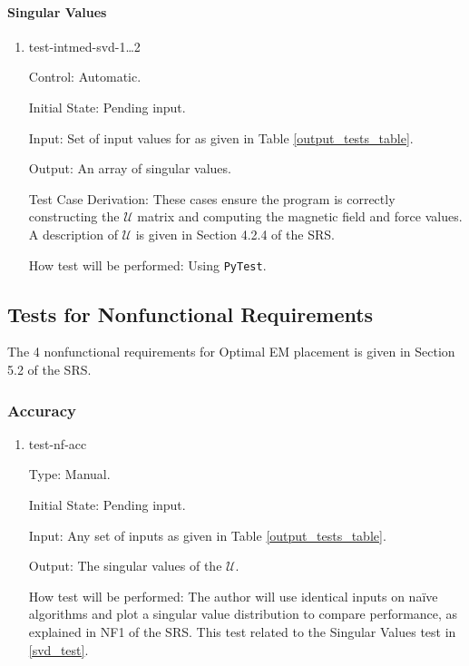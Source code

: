 \documentclass[12pt, titlepage]{article}
\begin{document}
\paragraph{Singular Values}

\begin{enumerate}

  \item{test-intmed-svd-1\dots2\\} 
  
  Control: Automatic.
            
  Initial State: Pending input.
            
  Input: Set of input values for as given in Table \ref{output_tests_table}.
            
  Output: An array of singular values. 
  
  Test Case Derivation: These cases ensure the program is correctly constructing the $\mathcal{U}$ matrix and computing the magnetic field and force values. A description of $\mathcal{U}$ is given in Section 4.2.4 of the SRS.
            
  How test will be performed: Using \texttt{PyTest}. 
\end{enumerate}

\subsection{Tests for Nonfunctional Requirements}
The 4 nonfunctional requirements for Optimal EM placement is given in Section 5.2 of the SRS. 
\subsubsection{Accuracy}
\begin{enumerate}

\item{test-nf-acc\\}

Type: Manual.
					
Initial State: Pending input.
					
Input: Any set of inputs as given in Table \ref{output_tests_table}.
					
Output: The singular values of the $\mathcal{U}$.
					
How test will be performed: The author will use identical inputs on naïve algorithms and plot a singular value distribution to compare performance, as explained in NF1 of the SRS. This test related to the Singular Values test in \ref{svd_test}.
\end{enumerate}
\end{document}
